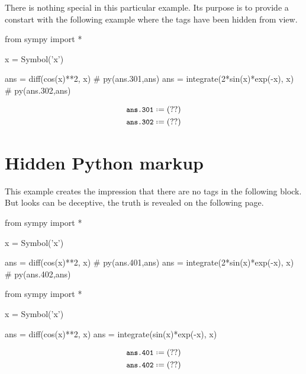\documentclass[12pt]{pylatex}
\begin{document}
There is nothing special in this particular example. Its purpose is to provide a constart with the following example where the tags have been hidden from view.

\vspace{5pt}


\begin{python}
   from sympy import *

   x = Symbol('x')

   ans = diff(cos(x)**2, x)                         # py(ans.301,ans)
   ans = integrate(2*sin(x)*exp(-x), x)             # py(ans.302,ans)
\end{python}

\begin{align*}
   &\py*{ans.301}\\
   &\py*{ans.302}
\end{align*}

\section*{Hidden Python markup}
This example creates the impression that there are no tags in the following block. But looks can be deceptive, the truth is revealed on the following page.

\vspace{5pt}


\begin{python}
   from sympy import *

   x = Symbol('x')

   ans = diff(cos(x)**2, x)                         # py(ans.401,ans)
   ans = integrate(2*sin(x)*exp(-x), x)             # py(ans.402,ans)
\end{python}


\begin{python}
   from sympy import *

   x = Symbol('x')

   ans = diff(cos(x)**2, x)
   ans = integrate(sin(x)*exp(-x), x)
\end{python}

\begin{align*}
   &\py*{ans.401}\\
   &\py*{ans.402}
\end{align*}

\clearpage
\end{document}
